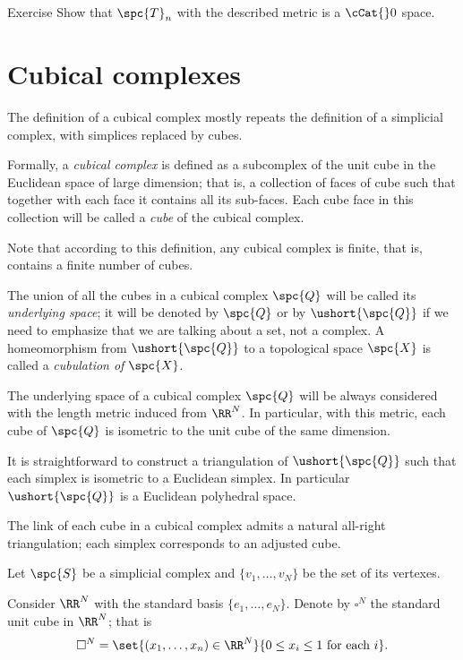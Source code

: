 \begin{thm}{Exercise}
Show that $\spc{T}_n$ with the described metric is a $\cCat{}0$ space.
\end{thm}



\section{Cubical complexes}

The definition of a cubical complex
mostly repeats the definition of a simplicial complex, 
with simplices replaced by cubes.

Formally, a \emph{cubical complex} is defined as a subcomplex 
of the unit cube in the Euclidean space of large dimension;
that is, a collection of faces of cube
such that together with each face it contains all its sub-faces.
Each cube face in this collection 
will be called a \emph{cube} of the cubical complex.

Note that according to this definition, 
any cubical complex is finite,
that is, contains a finite number of cubes.

The union of all the cubes in a cubical complex $\spc{Q}$ will be called its \emph{underlying space};
it will be denoted by $\spc{Q}$ or by $\ushort{\spc{Q}}$ 
if we need to emphasize that we are talking about a set, 
not a complex.
A homeomorphism from $\ushort{\spc{Q}}$ to a topological space $\spc{X}$ is called a \emph{cubulation of} $\spc{X}$.

The underlying space of a cubical complex $\spc{Q}$ will be always considered with the length metric
induced from $\RR^N$.
In particular, with this metric, 
each cube of $\spc{Q}$ is isometric to the unit cube of the same dimension.

It is straightforward to construct a triangulation 
of $\ushort{\spc{Q}}$ 
such that each simplex is isometric to a Euclidean simplex.
In particular $\ushort{\spc{Q}}$ is a Euclidean polyhedral space.

The link of each cube in a cubical complex admits a natural 
all-right triangulation; 
each simplex corresponds to an adjusted cube.

Let $\spc{S}$ be a simplicial complex and $\{v_1,\dots,v_N\}$ be the set of its vertexes.

Consider $\RR^N$ with the standard basis $\{e_1,\dots,e_N\}$.
Denote by $\square^N$ the standard unit cube in $\RR^N$;
that is 
\[\square^N=\set{(x_1,\dots,x_n)\in \RR^N}{0\le x_i\le 1\ \text{for each}\ i}.\]

